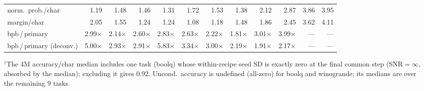 \begin{table}[!htbp]
{\begin{tabular}{@{}lrrrrrrrrrrr@{}}
norm.\ prob./char      & 1.19 & 1.48 & 1.46 & 1.31 & 1.72 & 1.53 & 1.38 & 2.12 & 2.87 & 3.86 & 3.95 \\
margin/char            & 2.05 & 1.55 & 1.24 & 1.24 & 1.08 & 1.18 & 1.48 & 1.86 & 2.45 & 3.62 & 4.11 \\
\midrule
bpb\,/\,primary        & 2.99$\times$ & 2.14$\times$ & 2.60$\times$ & 2.83$\times$ & 2.63$\times$ & 2.22$\times$ & 1.81$\times$ & 3.01$\times$ & 3.99$\times$ & --- & --- \\
bpb\,/\,primary (deconv.) & 5.00$\times$ & 2.93$\times$ & 2.91$\times$ & 5.83$\times$ & 3.34$\times$ & 3.00$\times$ & 2.19$\times$ & 1.91$\times$ & 2.17$\times$ & --- & --- \\
\bottomrule
\end{tabular}}
\vspace{2pt}
\parbox{\linewidth}{\footnotesize $^{\dagger}$The 4M accuracy/char median includes one task
(boolq) whose within-recipe seed SD is exactly zero at the final common step
(SNR${=}\infty$, absorbed by the median); excluding it gives 0.92.
Uncond.\ accuracy is undefined (all-zero) for boolq and winogrande; its medians are over the
remaining 9 tasks.}
\end{table}
